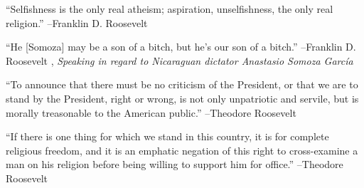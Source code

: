 \documentclass{article}%
\begin{document}
\linebreak%
\vspace{1mm}%
\begin{minipage}{\textwidth}%
\flushleft%
“Selfishness is the only real atheism; aspiration, unselfishness, the only real religion.”%
\linebreak%
\vspace{1mm}%
–Franklin D. Roosevelt%
\linebreak%
\vspace{1mm}%
\end{minipage}%
\linebreak%
\vspace{1mm}%
\begin{minipage}{\textwidth}%
\flushleft%
“He {[}Somoza{]} may be a son of a bitch, but he's our son of a bitch.”%
\linebreak%
\vspace{1mm}%
–Franklin D. Roosevelt%
, \textit{Speaking in regard to Nicaraguan dictator Anastasio Somoza García}%
\linebreak%
\vspace{1mm}%
\end{minipage}%
\linebreak%
\vspace{1mm}%
\begin{minipage}{\textwidth}%
\flushleft%
“To announce that there must be no criticism of the President, or that we are to stand by the President, right or wrong, is not only unpatriotic and servile, but is morally treasonable to the American public.”%
\linebreak%
\vspace{1mm}%
–Theodore Roosevelt%
\linebreak%
\vspace{1mm}%
\end{minipage}%
\linebreak%
\vspace{1mm}%
\begin{minipage}{\textwidth}%
\flushleft%
“If there is one thing for which we stand in this country, it is for complete religious freedom, and it is an emphatic negation of this right to cross{-}examine a man on his religion before being willing to support him for office.”%
\linebreak%
\vspace{1mm}%
–Theodore Roosevelt%
\linebreak%
\vspace{1mm}%
\end{minipage}%
\end{document}
